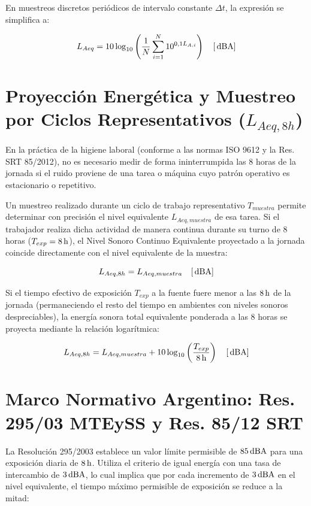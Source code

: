 En muestreos discretos periódicos de intervalo constante $\Delta t$, la expresión se simplifica a:

\begin{equation}
\label{eq.ej1:laeq_discreto}
L_{Aeq} = 10 \log_{10} \left( \frac{1}{N} \sum_{i=1}^{N} 10^{0,1 L_{A,i}} \right) \quad [\,\mathrm{dBA}]
\end{equation}

\section{Proyección Energética y Muestreo por Ciclos Representativos ($L_{Aeq,8h}$)}
En la práctica de la higiene laboral (conforme a las normas ISO 9612 y la Res. SRT 85/2012), no es necesario
medir de forma ininterrumpida las 8 horas de la jornada si el ruido proviene de una tarea o máquina cuyo patrón
operativo es estacionario o repetitivo.

Un muestreo realizado durante un ciclo de trabajo representativo $T_{muestra}$ permite determinar con precisión
el nivel equivalente $L_{Aeq,muestra}$ de esa tarea. Si el trabajador realiza dicha actividad de manera continua
durante su turno de 8 horas ($T_{exp} = 8\,\mathrm{h}$), el Nivel Sonoro Continuo Equivalente proyectado a la jornada
coincide directamente con el nivel equivalente de la muestra:

\begin{equation}
\label{eq.ej1:laeq8h_igual}
L_{Aeq,8h} = L_{Aeq,muestra} \quad [\,\mathrm{dBA}]
\end{equation}

Si el tiempo efectivo de exposición $T_{exp}$ a la fuente fuere menor a las $8\,\mathrm{h}$ de la jornada (permaneciendo el
resto del tiempo en ambientes con niveles sonoros despreciables), la energía sonora total equivalente ponderada
a las 8 horas se proyecta mediante la relación logarítmica:

\begin{equation}
\label{eq.ej1:laeq8h_parcial}
L_{Aeq,8h} = L_{Aeq,muestra} + 10 \log_{10} \left( \frac{T_{exp}}{8\,\mathrm{h}} \right) \quad [\,\mathrm{dBA}]
\end{equation}

\section{Marco Normativo Argentino: Res. 295/03 MTEySS y Res. 85/12 SRT}
La Resolución 295/2003 establece un valor límite permisible de $85\,\mathrm{dBA}$ para una exposición diaria de $8\,\mathrm{h}$.
Utiliza el criterio de igual energía con una tasa de intercambio de $3\,\mathrm{dBA}$, lo cual implica que por cada incremento
de $3\,\mathrm{dBA}$ en el nivel equivalente, el tiempo máximo permisible de exposición se reduce a la mitad:

